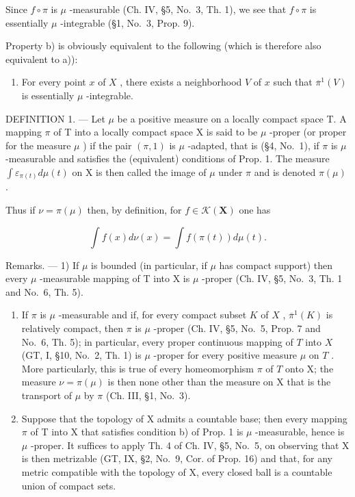 Since \(f \circ \pi\) is \(\mu\) -measurable (Ch. IV, §5, No.~3, Th. 1), we see that \(f \circ \pi\) is essentially \(\mu\) -integrable (§1, No.~3, Prop. 9).

Property b) is obviously equivalent to the following (which is therefore also equivalent to a)):

\begin{enumerate}
\def\labelenumi{\alph{enumi})}
\setcounter{enumi}{2}
\tightlist
\item
  For every point \(x\) of \(X\) , there exists a neighborhood \(V\) of \(x\) such that \(\overline{\pi}^1(V)\) is essentially \(\mu\) -integrable.
\end{enumerate}

DEFINITION 1. --- Let \(\mu\) be a positive measure on a locally compact space T. A mapping \(\pi\) of T into a locally compact space X is said to be \(\mu\) -proper (or proper for the measure \(\mu\) ) if the pair \((\pi,1)\) is \(\mu\) -adapted, that is (§4, No.~1), if \(\pi\) is \(\mu\) -measurable and satisfies the (equivalent) conditions of Prop. 1. The measure \(\int \varepsilon_{\pi(t)} d\mu(t)\) on X is then called the image of \(\mu\) under \(\pi\) and is denoted \(\pi(\mu)\) .

Thus if \(\nu = \pi (\mu)\) then, by definition, for \(f\in \mathcal{K}(\mathbf{X})\) one has

\[
\int f (x) d \nu (x) = \int f (\pi (t)) d \mu (t).\tag{1}
\]

Remarks. --- 1) If \(\mu\) is bounded (in particular, if \(\mu\) has compact support) then every \(\mu\) -measurable mapping of T into X is \(\mu\) -proper (Ch. IV, §5, No.~3, Th. 1 and No.~6, Th. 5).

\begin{enumerate}
\def\labelenumi{\arabic{enumi})}
\setcounter{enumi}{1}
\item
  If \(\pi\) is \(\mu\) -measurable and if, for every compact subset \(K\) of \(X\) , \(\overline{\pi}^{1}(K)\) is relatively compact, then \(\pi\) is \(\mu\) -proper (Ch. IV, §5, No.~5, Prop. 7 and No.~6, Th. 5); in particular, every proper continuous mapping of \(T\) into \(X\) (GT, I, §10, No.~2, Th. 1) is \(\mu\) -proper for every positive measure \(\mu\) on \(T\) . More particularly, this is true of every homeomorphism \(\pi\) of \(T\) onto X; the measure \(\nu = \pi(\mu)\) is then none other than the measure on X that is the transport of \(\mu\) by \(\pi\) (Ch. III, §1, No.~3).
\item
  Suppose that the topology of X admits a countable base; then every mapping \(\pi\) of T into X that satisfies condition b) of Prop. 1 is \(\mu\) -measurable, hence is \(\mu\) -proper. It suffices to apply Th. 4 of Ch. IV, §5, No.~5, on observing that X is then metrizable (GT, IX, §2, No.~9, Cor. of Prop. 16) and that, for any metric compatible with the topology of X, every closed ball is a countable union of compact sets.
\end{enumerate}

